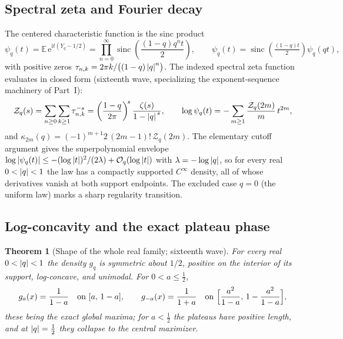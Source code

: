 \documentclass[11pt,oneside]{article}
\numberwithin{equation}{section}
\newtheorem{theorem}{Theorem}[section]
\theoremstyle{definition}
\theoremstyle{remark}
\newcommand{\E}{\mathbb E}
\newcommand{\sinc}{\operatorname{sinc}}
\newcommand{\e}{\mathrm e}
\newcommand{\ii}{\mathrm i}
\newcommand{\bigO}{\mathcal O}
\newcommand{\Zspec}{\mathcal Z}
\begin{document}
\subsection{Spectral zeta and Fourier decay}

The centered characteristic function is the sinc product
\begin{equation}\label{p7:eq:psi-sinc}
 \psi_q(t)=\E\,\e^{\ii t(Y_q-1/2)}
 =\prod_{n=0}^{\infty}
 \sinc\!\left(\frac{(1-q)q^nt}{2}\right),
 \qquad
 \psi_q(t)=\sinc\!\left(\tfrac{(1-q)t}2\right)\psi_q(qt),
\end{equation}
with positive zeros $\tau_{n,k}=2\pi k/\bigl((1-q)\left\lvert q\right\rvert^n\bigr)$.  The
indexed spectral zeta function evaluates in closed form (sixteenth wave,
specializing the exponent-sequence machinery of Part~I):
\begin{equation}\label{p7:eq:spectral-zeta}
 \Zspec_q(s)=\sum_{n\ge0}\sum_{k\ge1}\tau_{n,k}^{-s}
 =\left(\frac{1-q}{2\pi}\right)^{\!s}\frac{\zeta(s)}{1-\abs q^{\,s}},
 \qquad
 \log\psi_q(t)=-\sum_{m\ge1}\frac{\Zspec_q(2m)}m\,t^{2m},
\end{equation}
and $\kappa_{2m}(q)=(-1)^{m+1}2\,(2m-1)!\,\Zspec_q(2m)$.  The elementary
cutoff argument gives the superpolynomial envelope
$\log\abs{\psi_q(t)}\le-(\log\abs t)^2/(2\lambda)+\bigO_q(\log\abs t)$ with
$\lambda=-\log\left\lvert q\right\rvert$, so for every real $0<\left\lvert q\right\rvert<1$ the law has a compactly
supported $C^\infty$ density, all of whose derivatives vanish at both support
endpoints.  The excluded case $q=0$ (the uniform law) marks a sharp regularity
transition.

\subsection{Log-concavity and the exact plateau phase}

\begin{theorem}[Shape of the whole real family; sixteenth wave]
\label{p7:thm:shape}
For every real $0<\left\lvert q\right\rvert<1$ the density $g_q$ is symmetric about $1/2$,
positive on the interior of its support, log-concave, and unimodal.  For
$0<a\le\tfrac12$,
\begin{equation}\label{p7:eq:plateau}
 g_a(x)=\frac1{1-a}
 \quad\text{on }[a,\,1-a],
 \qquad
 g_{-a}(x)=\frac1{1+a}
 \quad\text{on }\Bigl[\frac{a^2}{1-a},\,1-\frac{a^2}{1-a}\Bigr],
\end{equation}
these being the exact global maxima; for $a<\tfrac12$ the plateaus have
positive length, and at $\left\lvert q\right\rvert=\tfrac12$ they collapse to the central
maximizer.
\end{theorem}
\end{document}
